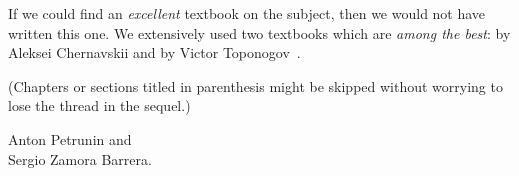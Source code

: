 If we could find an \emph{excellent} textbook on the subject, then we would not have written this one.
We extensively used two textbooks which are \emph{among the best}: by Aleksei Chernavskii \cite{chernavsky} and by Victor Toponogov~\cite{toponogov-book}.

(Chapters or sections titled in parenthesis might be skipped without worrying to lose the thread in the sequel.)

\begin{flushright}
Anton Petrunin and\\
Sergio Zamora Barrera.
\end{flushright}



\newpage
\tableofcontents
